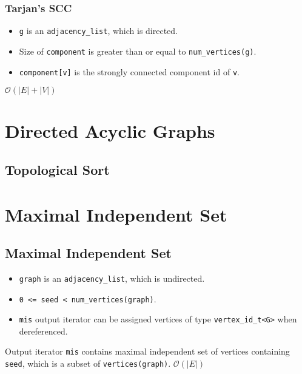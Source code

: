 \subsubsection{Tarjan's SCC}
{\small
      
}
\begin{itemdescr}
      \pnum\preconditions
      \begin{itemize}
            \item
                  \lstinline{g} is an \lstinline{adjacency_list}, which is directed.
            \item
                  Size of \lstinline{component} is greater than or equal to \lstinline{num_vertices(g)}.
      \end{itemize}
      \pnum\effects
      \begin{itemize}
            \item
                  \lstinline{component[v]} is the strongly connected component id of \lstinline{v}.
      \end{itemize}

      \pnum\complexity $\mathcal{O}(|E|+|V|)$
\end{itemdescr}

\section{Directed Acyclic Graphs}
\subsection{Topological Sort}

\section{Maximal Independent Set}
\subsection{Maximal Independent Set}

{\small
      
}
\begin{itemdescr}
      \pnum\preconditions
      \begin{itemize}
            \item
                  \lstinline{graph} is an \lstinline{adjacency_list}, which is undirected.
            \item
                  \lstinline{0 <= seed < num_vertices(graph)}.
            \item
                  \lstinline{mis} output iterator can be assigned vertices of type \lstinline{vertex_id_t<G>} when dereferenced.
      \end{itemize}
      \pnum\effects Output iterator \lstinline{mis} contains maximal independent set of vertices containing \lstinline{seed}, which is a subset of \lstinline{vertices(graph)}.
      \pnum\complexity $\mathcal{O}(|E|)$
\end{itemdescr}

